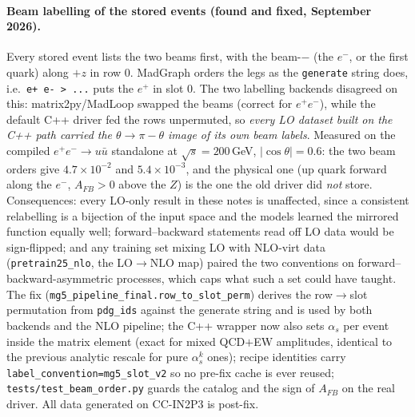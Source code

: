 \documentclass[11pt]{article}
\newcommand{\code}[1]{\texttt{#1}}
\begin{document}
\paragraph{Beam labelling of the stored events (found and fixed, September 2026).}
Every stored event lists the two beams first, with the beam-$-$ (the $e^-$, or the first
quark) along $+z$ in row 0. MadGraph orders the legs as the \code{generate} string does,
i.e.\ \code{e+ e- > ...} puts the $e^+$ in slot 0. The two labelling backends disagreed on
this: matrix2py/MadLoop swapped the beams (correct for $e^+e^-$), while the default C++
driver fed the rows unpermuted, so \emph{every LO dataset built on the C++ path carried
the $\theta\to\pi-\theta$ image of its own beam labels}. Measured on the compiled
$e^+e^-\to u\bar u$ standalone at $\sqrt s=200$\,GeV, $|\cos\theta|=0.6$: the two beam
orders give $4.7\times10^{-2}$ and $5.4\times10^{-3}$, and the physical one (up quark
forward along the $e^-$, $A_{FB}>0$ above the $Z$) is the one the old driver did
\emph{not} store. Consequences: every LO-only result in these notes is unaffected, since
a consistent relabelling is a bijection of the input space and the models learned the
mirrored function equally well; forward--backward statements read off LO data would be
sign-flipped; and any training set mixing LO with NLO-virt data (\code{pretrain25\_nlo},
the LO$\to$NLO map) paired the two conventions on forward--backward-asymmetric
processes, which caps what such a set could have taught. The fix
(\code{mg5\_pipeline\_final.row\_to\_slot\_perm}) derives the row$\to$slot permutation
from \code{pdg\_ids} against the generate string and is used by both backends and the NLO
pipeline; the C++ wrapper now also sets $\alpha_s$ per event inside the matrix element
(exact for mixed QCD$+$EW amplitudes, identical to the previous analytic rescale for
pure $\alpha_s^k$ ones); recipe identities carry \code{label\_convention=mg5\_slot\_v2} so
no pre-fix cache is ever reused; \code{tests/test\_beam\_order.py} guards the catalog and
the sign of $A_{FB}$ on the real driver. All data generated on CC-IN2P3 is post-fix.
\end{document}
